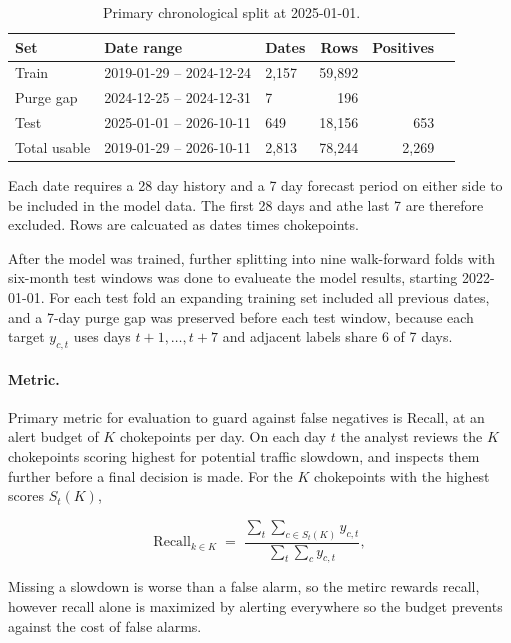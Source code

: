 \documentclass[11pt]{article}
\begin{document}
\begin{table}[h]
\centering
\begin{tabular}{lllrrr}
\toprule
Set & Date range & Dates & Rows & Positives \\
\midrule
Train & 2019-01-29 -- 2024-12-24 & 2{,}157 & 59{,}892 &  \\
Purge gap & 2024-12-25 -- 2024-12-31 & 7 & 196 &  \\
Test & 2025-01-01 -- 2026-10-11 & 649 & 18{,}156 & 653 \\
\midrule
Total usable & 2019-01-29 -- 2026-10-11 & 2{,}813 & 78{,}244 & 2{,}269 \\
\bottomrule
\end{tabular}
\caption{Primary chronological split at 2025-01-01. }
\label{tab:split}
\end{table}

Each date requires a 28 day history and a 7 day forecast period on either side to be included in the model data. The first 28 days and athe last 7 are therefore excluded. Rows are calcuated as dates times chokepoints. 

After the model was trained, further splitting into nine walk-forward folds \cite{kunsch}\cite{politis} with six-month test windows was done to evalueate the model results, starting 2022-01-01. For each test fold an expanding training set included all previous dates, and a 7-day purge gap was preserved before each test window, because each target $y_{c,t}$ uses days $t+1,\dots,t+7$ and adjacent labels share 6 of 7 days. 

\paragraph{Metric.}

Primary metric for evaluation to guard against false negatives is Recall, at an alert budget of $K$ chokepoints per day. On each day $t$ the analyst reviews the $K$ chokepoints scoring highest for potential traffic slowdown, and inspects them further before a final decision is made. For the $K$ chokepoints with the highest scores $S_t(K)$, 

\begin{equation}
    \mathrm{Recall}_{k \in K} \;=\;
\frac{\sum_{t}\sum_{c \in S_t(K)} y_{c,t}}{\sum_{t}\sum_{c} y_{c,t}},
\end{equation}

Missing a slowdown is worse than a false alarm, so the metirc rewards recall, however recall alone is maximized by alerting everywhere so the budget prevents against the cost of false alarms. 
\end{document}
